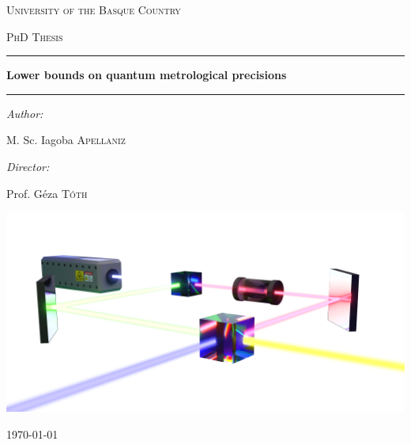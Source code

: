 

\begin{center}

\vspace*{20pt}
\textsc{\LARGE University of the Basque Country}

\vspace{20pt}
\textsc{\Large PhD Thesis}

\vspace{50pt} 
\hrule 

\vspace{16pt}
{\huge \bfseries Lower bounds on quantum metrological precisions}
\vspace{16pt}

\hrule
\vspace{40pt}

\begin{minipage}{0.4\textwidth}
\begin{flushleft} \large
\emph{Author:}


M. Sc. Iagoba \textsc{Apellaniz}
\end{flushleft}
\end{minipage}
\begin{minipage}{0.4\textwidth}
\begin{flushright} \large
\emph{Director:}

Prof. G\'eza \textsc{T\'oth} %
\end{flushright}
\end{minipage}

\vspace{40pt}
\includegraphics[width=0.8\hsize]{img/cover3Dpicture.png}
\vfill

{\large \today}

\end{center}

\cleardoublepage